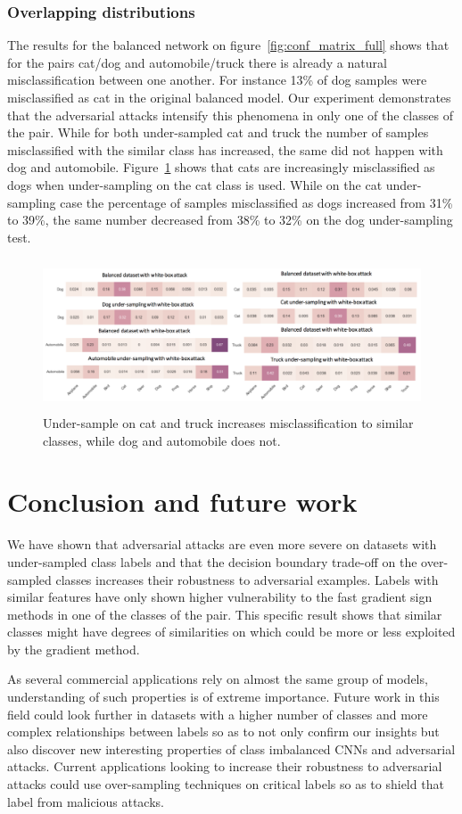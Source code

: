 \documentclass[runningheads,a4paper]{llncs}
\begin{document}
\subsubsection{Overlapping distributions} The results for the balanced network on figure~\ref{fig:conf_matrix_full} shows that for the pairs cat/dog and automobile/truck there is already a natural misclassification between one another. For instance 13\% of dog samples were misclassified as cat in the original balanced model. Our experiment demonstrates that the adversarial attacks intensify this phenomena in only one of the classes of the pair. While for both under-sampled cat and truck the number of samples misclassified with the similar class has increased, the same did not happen with dog and automobile. Figure~\ref{fig:overlap} shows that cats are increasingly misclassified as dogs when under-sampling on the cat class is used. While on the cat under-sampling case the percentage of samples misclassified as dogs increased from 31\% to 39\%, the same number decreased from 38\% to 32\% on the dog under-sampling test.
\begin{figure}
	\centering
	\includegraphics[height=4.5cm]{overlapping_all.png}
	\caption{Under-sample on cat and truck increases misclassification to similar classes, while dog and automobile does not.}
	\label{fig:overlap}
\end{figure}
\section{Conclusion and future work}

We have shown that adversarial attacks are even more severe on datasets with under-sampled class labels and that the decision boundary trade-off on the over-sampled classes increases their robustness to adversarial examples. Labels with similar features have only shown higher vulnerability to the fast gradient sign methods in one of the classes of the pair. This specific result shows that similar classes might have degrees of similarities on which could be more or less exploited by the gradient method.  

As several commercial applications rely on almost the same group of models, understanding of such properties is of extreme importance. Future work in this field could look further in datasets with a higher number of classes and more complex relationships between labels so as to not only confirm our insights but also discover new interesting properties of class imbalanced CNNs and adversarial attacks. Current applications looking to increase their robustness to adversarial attacks could use over-sampling techniques on critical labels so as to shield that label from malicious attacks.



\end{document}
